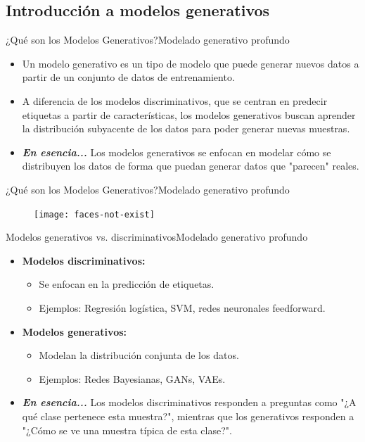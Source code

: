 \documentclass[10pt,border=3pt,tikz]{beamer}
\begin{document}
    \subsection{Introducción a modelos generativos}
    
    \begin{frame}{¿Qué son los Modelos Generativos?}{Modelado generativo profundo}
        \begin{itemize}
            \item Un modelo generativo es un tipo de modelo que puede generar nuevos datos a partir de un conjunto de datos de entrenamiento.
            \item A diferencia de los modelos discriminativos, que se centran en predecir etiquetas a partir de características, los modelos generativos buscan aprender la distribución subyacente de los datos para poder generar nuevas muestras.
            \item \textbf{\textit{En esencia...}} Los modelos generativos se enfocan en modelar cómo se distribuyen los datos de forma que puedan generar datos que "parecen" reales.
        \end{itemize}
    \end{frame}
    
    \begin{frame}{¿Qué son los Modelos Generativos?}{Modelado generativo profundo}
        \begin{figure}
            \centering
            \texttt{[image: faces-not-exist]}
        \end{figure}
    \end{frame}
    
    \begin{frame}{Modelos generativos vs. discriminativos}{Modelado generativo profundo}
        \begin{itemize}
            \item \textbf{Modelos discriminativos:}
            \begin{itemize}
                \item Se enfocan en la predicción de etiquetas.
                \item Ejemplos: Regresión logística, SVM, redes neuronales feedforward.
            \end{itemize}
            \item \textbf{Modelos generativos:}
            \begin{itemize}
                \item Modelan la distribución conjunta de los datos.
                \item Ejemplos: Redes Bayesianas, GANs, VAEs.
            \end{itemize}
            \item \textbf{\textit{En esencia...}} Los modelos discriminativos responden a preguntas como "¿A qué clase pertenece esta muestra?", mientras que los generativos responden a "¿Cómo se ve una muestra típica de esta clase?".
        \end{itemize}
    \end{frame}
    
\end{document}
